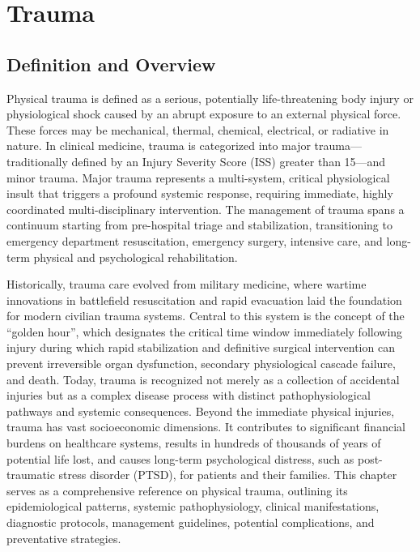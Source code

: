 \chapter{Trauma}

\section*{Definition and Overview}
Physical trauma is defined as a serious, potentially life-threatening body injury or physiological shock caused by an abrupt exposure to an external physical force. These forces may be mechanical, thermal, chemical, electrical, or radiative in nature. In clinical medicine, trauma is categorized into major trauma---traditionally defined by an Injury Severity Score (ISS) greater than 15---and minor trauma. Major trauma represents a multi-system, critical physiological insult that triggers a profound systemic response, requiring immediate, highly coordinated multi-disciplinary intervention. The management of trauma spans a continuum starting from pre-hospital triage and stabilization, transitioning to emergency department resuscitation, emergency surgery, intensive care, and long-term physical and psychological rehabilitation.

Historically, trauma care evolved from military medicine, where wartime innovations in battlefield resuscitation and rapid evacuation laid the foundation for modern civilian trauma systems. Central to this system is the concept of the ``golden hour'', which designates the critical time window immediately following injury during which rapid stabilization and definitive surgical intervention can prevent irreversible organ dysfunction, secondary physiological cascade failure, and death. Today, trauma is recognized not merely as a collection of accidental injuries but as a complex disease process with distinct pathophysiological pathways and systemic consequences. Beyond the immediate physical injuries, trauma has vast socioeconomic dimensions. It contributes to significant financial burdens on healthcare systems, results in hundreds of thousands of years of potential life lost, and causes long-term psychological distress, such as post-traumatic stress disorder (PTSD), for patients and their families. This chapter serves as a comprehensive reference on physical trauma, outlining its epidemiological patterns, systemic pathophysiology, clinical manifestations, diagnostic protocols, management guidelines, potential complications, and preventative strategies.

